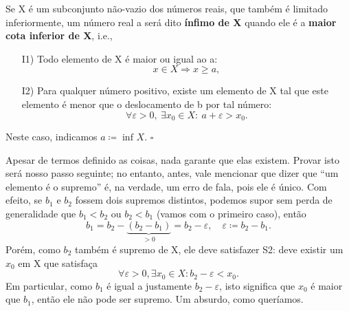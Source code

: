 \documentclass[../analysisII_notes.tex]{subfiles}
\begin{document}
\begin{def*}
	Se X é um subconjunto não-vazio dos números reais, que também é limitado inferiormente, um número real a será dito \textbf{ínfimo de X} quando ele é a \textbf{maior cota inferior de X}, i.e.,
	\begin{itemize}
		\item[I1)] Todo elemento de X é maior ou igual ao a:
		      \[
			      x\in X \Rightarrow x \geq a,
		      \]
		\item[I2)] Para qualquer número positivo, existe um elemento de X tal que este elemento é menor que o deslocamento de b por tal número:
		      \[
			      \forall \varepsilon > 0,\: \exists x_{0}\in X: \: a + \varepsilon > x_{0}.
		      \]
	\end{itemize}
	Neste caso, indicamos \(a\coloneqq \inf_{}X\). \(\square\)
\end{def*}
Apesar de termos definido as coisas, nada garante que elas existem. Provar isto será nosso passo seguinte; no entanto, antes, vale mencionar que dizer que ``um elemento é o supremo'' é, na verdade,
um erro de fala, pois ele é único. Com efeito, se \(b_1 \) e \(b_2\) fossem dois supremos distintos, podemos supor sem perda de generalidade que \(b_1 < b_2\) ou \(b_2 < b_1\) (vamos com o primeiro caso), então
\[
	b_{1} = b_{2} - \underbrace{(b_2 - b_1)}_{>0} = b_{2} - \varepsilon , \quad \varepsilon \coloneqq b_{2} - b_{1}.
\]
Porém, como \(b_{2}\) também é supremo de X, ele deve satisfazer S2: deve existir um \(x_{0}\) em X que satisfaça
\[
	\forall \varepsilon > 0, \exists x_{0}\in X: b_{2} - \varepsilon < x_{0}.
\]
Em particular, como \(b_1\) é igual a justamente \(b_2 - \varepsilon \), isto significa que \(x_{0}\) é maior que \(b_1\), então ele não pode ser supremo. Um absurdo, como queríamos.
\end{document}

